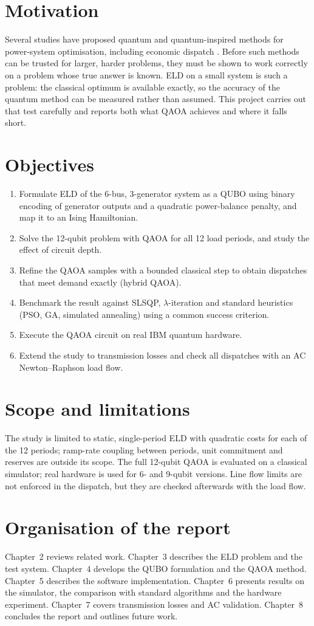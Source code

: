 \section{Motivation}
Several studies have proposed quantum and quantum-inspired methods for power-system optimisation, including economic dispatch \cite{han2024,jing2023,wang2024}. Before such methods can be trusted for larger, harder problems, they must be shown to work correctly on a problem whose true answer is known. ELD on a small system is such a problem: the classical optimum is available exactly, so the accuracy of the quantum method can be measured rather than assumed. This project carries out that test carefully and reports both what QAOA achieves and where it falls short.

\section{Objectives}
\begin{enumerate}
\item Formulate ELD of the 6-bus, 3-generator system as a QUBO using binary encoding of generator outputs and a quadratic power-balance penalty, and map it to an Ising Hamiltonian.
\item Solve the 12-qubit problem with QAOA for all 12 load periods, and study the effect of circuit depth.
\item Refine the QAOA samples with a bounded classical step to obtain dispatches that meet demand exactly (hybrid QAOA).
\item Benchmark the result against SLSQP, $\lambda$-iteration and standard heuristics (PSO, GA, simulated annealing) using a common success criterion.
\item Execute the QAOA circuit on real IBM quantum hardware.
\item Extend the study to transmission losses and check all dispatches with an AC Newton--Raphson load flow.
\end{enumerate}

\section{Scope and limitations}
The study is limited to static, single-period ELD with quadratic costs for each of the 12 periods; ramp-rate coupling between periods, unit commitment and reserves are outside its scope. The full 12-qubit QAOA is evaluated on a classical simulator; real hardware is used for 6- and 9-qubit versions. Line flow limits are not enforced in the dispatch, but they are checked afterwards with the load flow.

\section{Organisation of the report}
Chapter~2 reviews related work. Chapter~3 describes the ELD problem and the test system. Chapter~4 develops the QUBO formulation and the QAOA method. Chapter~5 describes the software implementation. Chapter~6 presents results on the simulator, the comparison with standard algorithms and the hardware experiment. Chapter~7 covers transmission losses and AC validation. Chapter~8 concludes the report and outlines future work.
